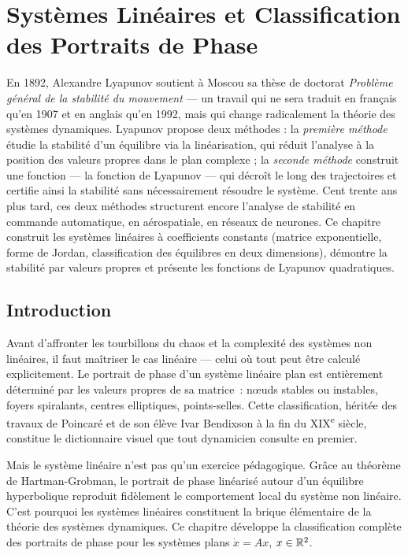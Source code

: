 \chapter{Syst\`emes Lin\'eaires et Classification des Portraits de Phase}
\label{ch:lineaires}

En 1892, Alexandre Lyapunov soutient à Moscou sa thèse de doctorat \emph{Problème général de la stabilité du mouvement} --- un travail qui ne sera traduit en français qu'en 1907 et en anglais qu'en 1992, mais qui change radicalement la théorie des systèmes dynamiques. Lyapunov propose deux méthodes : la \emph{première méthode} étudie la stabilité d'un équilibre via la linéarisation, qui réduit l'analyse à la position des valeurs propres dans le plan complexe ; la \emph{seconde méthode} construit une fonction --- la fonction de Lyapunov --- qui décroît le long des trajectoires et certifie ainsi la stabilité sans nécessairement résoudre le système. Cent trente ans plus tard, ces deux méthodes structurent encore l'analyse de stabilité en commande automatique, en aérospatiale, en réseaux de neurones. Ce chapitre construit les systèmes linéaires à coefficients constants (matrice exponentielle, forme de Jordan, classification des équilibres en deux dimensions), démontre la stabilité par valeurs propres et présente les fonctions de Lyapunov quadratiques.

\section{Introduction}

Avant d'affronter les tourbillons du chaos et la complexit\'e des syst\`emes non lin\'eaires, il faut ma\^itriser le cas lin\'eaire --- celui o\`u tout peut \^etre calcul\'e explicitement. Le portrait de phase d'un syst\`eme lin\'eaire plan est enti\`erement d\'etermin\'e par les valeurs propres de sa matrice~: n\oe uds stables ou instables, foyers spiralants, centres elliptiques, points-selles. Cette classification, h\'erit\'ee des travaux de Poincar\'e et de son \'el\`eve Ivar Bendixson \`a la fin du XIX\textsuperscript{e} si\`ecle, constitue le dictionnaire visuel que tout dynamicien consulte en premier.

Mais le syst\`eme lin\'eaire n'est pas qu'un exercice p\'edagogique. Gr\^ace au th\'eor\`eme de Hartman-Grobman, le portrait de phase lin\'earis\'e autour d'un \'equilibre hyperbolique reproduit fid\`element le comportement local du syst\`eme non lin\'eaire. C'est pourquoi les syst\`emes lin\'eaires constituent la brique \'el\'ementaire de la th\'eorie
des syst\`emes dynamiques. Ce chapitre d\'eveloppe la
classification compl\`ete des portraits de phase pour les syst\`emes plans
$\dot{x} = Ax$, $x \in \mathbb{R}^2$.

